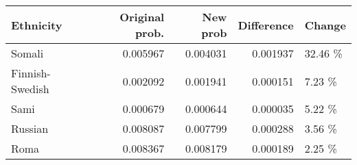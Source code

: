 \begin{tabular}{lrrrl}
\toprule
      Ethnicity &  Original prob. &  New prob &  Difference &  Change \\
\midrule
         Somali &        0.005967 &  0.004031 &    0.001937 & 32.46 \% \\
Finnish-Swedish &        0.002092 &  0.001941 &    0.000151 &  7.23 \% \\
           Sami &        0.000679 &  0.000644 &    0.000035 &  5.22 \% \\
        Russian &        0.008087 &  0.007799 &    0.000288 &  3.56 \% \\
           Roma &        0.008367 &  0.008179 &    0.000189 &  2.25 \% \\
\bottomrule
\end{tabular}
